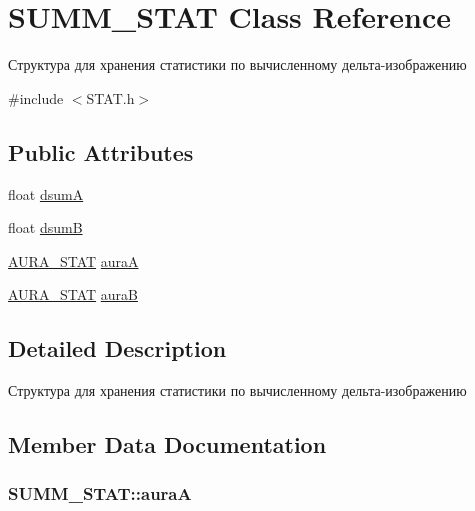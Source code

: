 \hypertarget{class_s_u_m_m___s_t_a_t}{\section{S\+U\+M\+M\+\_\+\+S\+T\+A\+T Class Reference}
\label{class_s_u_m_m___s_t_a_t}
}


Структура для хранения статистики по вычисленному дельта-\/изображению  




{\ttfamily \#include $<$S\+T\+A\+T.\+h$>$}

\subsection*{Public Attributes}
\begin{DoxyCompactItemize}
\item 
float \hyperlink{class_s_u_m_m___s_t_a_t_afc39513fb57523e6b0f5031e0b028bb2}{dsum\+A}
\item 
float \hyperlink{class_s_u_m_m___s_t_a_t_ac9723fe5df3465505a22fa8eb259bccd}{dsum\+B}
\item 
\hyperlink{class_a_u_r_a___s_t_a_t}{A\+U\+R\+A\+\_\+\+S\+T\+A\+T} \hyperlink{class_s_u_m_m___s_t_a_t_a404b5e8880976ff65e8db9825063248b}{aura\+A}
\item 
\hyperlink{class_a_u_r_a___s_t_a_t}{A\+U\+R\+A\+\_\+\+S\+T\+A\+T} \hyperlink{class_s_u_m_m___s_t_a_t_aa4bd77e99f011e0c72809be3644521d5}{aura\+B}
\end{DoxyCompactItemize}


\subsection{Detailed Description}
Структура для хранения статистики по вычисленному дельта-\/изображению 



\subsection{Member Data Documentation}
\hypertarget{class_s_u_m_m___s_t_a_t_a404b5e8880976ff65e8db9825063248b}{
\subsubsection[{aura\+A}]{ S\+U\+M\+M\+\_\+\+S\+T\+A\+T\+::aura\+A}}\label{class_s_u_m_m___s_t_a_t_a404b5e8880976ff65e8db9825063248b}




